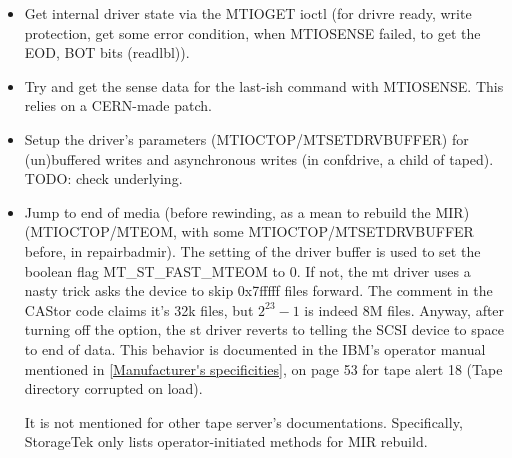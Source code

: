 \begin{itemize}
  \begin{itemize}
    \item Get internal driver state via the MTIOGET ioctl (for drivre ready, write protection, 
          get some error condition, when MTIOSENSE failed, to get the EOD, BOT bits (readlbl)).
    \item Try and get the sense data for the last-ish command with MTIOSENSE. This
          relies on a CERN-made patch.
    \item Setup the driver's parameters (MTIOCTOP/MTSETDRVBUFFER) for (un)buffered 
          writes and asynchronous writes (in confdrive, a child of taped).
          TODO: check underlying.
    \item Jump to end of media (before rewinding, as a mean to rebuild the MIR) (MTIOCTOP/MTEOM, 
          with some MTIOCTOP/MTSETDRVBUFFER before, in repairbadmir). The setting of the driver
          buffer is used to set the boolean flag MT\_ST\_FAST\_MTEOM to 0. If not, the mt driver uses
          a nasty trick asks the device to skip 0x7fffff files forward. The comment in the CAStor code
          claims it's 32k files, but $2^{23}-1$ is indeed 8M files. Anyway, after turning off the 
          option, the st driver reverts to telling the SCSI device to space to end of data.
          This behavior is documented in the IBM's operator manual mentioned in \ref{Manufacturer's specificities},
          on page 53 for tape alert 18 (Tape directory corrupted on load).

          It is not mentioned for other tape server's documentations. Specifically, StorageTek
          only lists operator-initiated methods for MIR rebuild.


\end{itemize}
\end{itemize}
